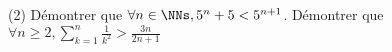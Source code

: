 %
%
		\begin{tasks}(2)
		\task Démontrer que $\forall n \in \NNs, 5^n + 5 < 5^{n+1}$.
		\task Démontrer que  $\forall n \ge 2, \sum\limits_{k=1}^n \frac{1}{k^2} > \frac{3n}{2n+1}$
		\end{tasks}
